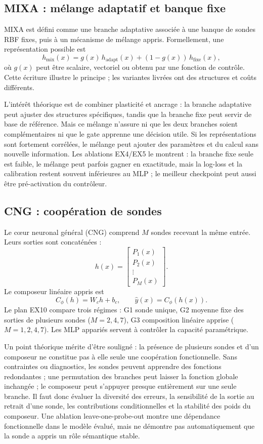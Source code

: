 \documentclass[11pt,a4paper]{article}
\begin{document}
\subsection{MIXA : mélange adaptatif et banque fixe}

MIXA est défini comme une branche adaptative associée à une banque de sondes RBF fixes, puis à un mécanisme de mélange appris. Formellement, une représentation possible est
\[
h_{\mathrm{mix}}(x)=g(x)\,h_{\mathrm{adapt}}(x)
              +(1-g(x))\,h_{\mathrm{fixe}}(x),
\]
où \(g(x)\) peut être scalaire, vectoriel ou obtenu par une fonction de contrôle. Cette écriture illustre le principe ; les variantes livrées ont des structures et coûts différents.

L'intérêt théorique est de combiner plasticité et ancrage : la branche adaptative peut ajuster des structures spécifiques, tandis que la branche fixe peut servir de base de référence. Mais ce mélange n'assure ni que les deux branches soient complémentaires ni que le gate apprenne une décision utile. Si les représentations sont fortement corrélées, le mélange peut ajouter des paramètres et du calcul sans nouvelle information. Les ablations EX4/EX5 le montrent : la branche fixe seule est faible, le mélange peut parfois gagner en exactitude, mais la log-loss et la calibration restent souvent inférieures au MLP ; le meilleur checkpoint peut aussi être pré-activation du contrôleur.

\subsection{CNG : coopération de sondes}

Le cœur neuronal général (CNG) comprend \(M\) sondes recevant la même entrée. Leurs sorties sont concaténées :
\[
h(x)=\begin{bmatrix}P_1(x)\\P_2(x)\\\vdots\\P_M(x)\end{bmatrix}.
\]
Le composeur linéaire appris est
\[
C_\phi(h)=W_c h+b_c,
\qquad
\widehat y(x)=C_\phi(h(x)).
\]
Le plan EX10 compare trois régimes : G1 sonde unique, G2 moyenne fixe des sorties de plusieurs sondes (\(M=2,4,7\)), G3 composition linéaire apprise (\(M=1,2,4,7\)). Les MLP appariés servent à contrôler la capacité paramétrique.

Un point théorique mérite d'être souligné : la présence de plusieurs sondes et d'un composeur ne constitue pas à elle seule une coopération fonctionnelle. Sans contraintes ou diagnostics, les sondes peuvent apprendre des fonctions redondantes ; une permutation des branches peut laisser la fonction globale inchangée ; le composeur peut s'appuyer presque entièrement sur une seule branche. Il faut donc évaluer la diversité des erreurs, la sensibilité de la sortie au retrait d'une sonde, les contributions conditionnelles et la stabilité des poids du composeur. Une ablation leave-one-probe-out montre une dépendance fonctionnelle dans le modèle évalué, mais ne démontre pas automatiquement que la sonde a appris un rôle sémantique stable.
\end{document}
